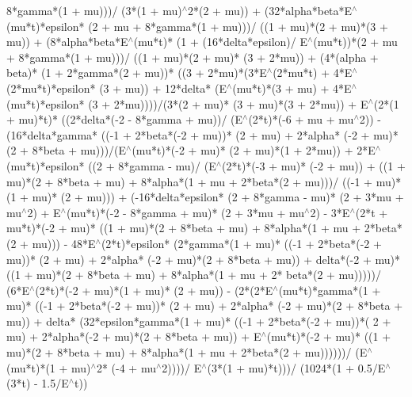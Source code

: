 \documentclass{article}
\begin{document}
\begin{doublespace}
{        8*gamma*(1 + mu)))/
      (3*(1 + mu)${}^{\wedge}$2*(2 + mu)) + 
     (32*alpha*beta*E${}^{\wedge}$(mu*t)*epsilon*
       (2 + mu + 8*gamma*(1 + mu)))/
      ((1 + mu)*(2 + mu)*(3 + mu)) + 
     (8*alpha*beta*E${}^{\wedge}$(mu*t)*
       (1 + (16*delta*epsilon)/
         E${}^{\wedge}$(mu*t))*(2 + mu + 
        8*gamma*(1 + mu)))/
      ((1 + mu)*(2 + mu)*
       (3 + 2*mu)) + 
     (4*(alpha + beta)*
       (1 + 2*gamma*(2 + mu))*
       ((3 + 2*mu)*(3*E${}^{\wedge}$(2*mu*t) + 
          4*E${}^{\wedge}$(2*mu*t)*epsilon*
           (3 + mu)) + 12*delta*
         (E${}^{\wedge}$(mu*t)*(3 + mu) + 
          4*E${}^{\wedge}$(mu*t)*epsilon*
           (3 + 2*mu))))/(3*(2 + mu)*
       (3 + mu)*(3 + 2*mu)) + 
     E${}^{\wedge}$(2*(1 + mu)*t)*
      ((2*delta*(-2 - 8*gamma + mu))/
        (E${}^{\wedge}$(2*t)*(-6 + mu + mu${}^{\wedge}$2)) - 
       (16*delta*gamma*
         ((-1 + 2*beta*(-2 + mu))*
           (2 + mu) + 2*alpha*
           (-2 + mu)*(2 + 8*beta + 
            mu)))/(E${}^{\wedge}$(mu*t)*(-2 + mu)*
         (2 + mu)*(1 + 2*mu)) + 
       2*E${}^{\wedge}$(mu*t)*epsilon*
        ((2 + 8*gamma - mu)/
          (E${}^{\wedge}$(2*t)*(-3 + mu)*
           (-2 + mu)) + 
         ((1 + mu)*(2 + 8*beta + 
            mu) + 8*alpha*(1 + mu + 
            2*beta*(2 + mu)))/
          ((-1 + mu)*(1 + mu)*
           (2 + mu))) + 
       (-16*delta*epsilon*
          (2 + 8*gamma - mu)*
          (2 + 3*mu + mu${}^{\wedge}$2) + 
         E${}^{\wedge}$(mu*t)*(-2 - 8*gamma + mu)*
          (2 + 3*mu + mu${}^{\wedge}$2) - 
         3*E${}^{\wedge}$(2*t + mu*t)*(-2 + mu)*
          ((1 + mu)*(2 + 8*beta + 
            mu) + 8*alpha*(1 + mu + 
            2*beta*(2 + mu))) - 
         48*E${}^{\wedge}$(2*t)*epsilon*
          (2*gamma*(1 + mu)*
            ((-1 + 2*beta*(-2 + mu))*
            (2 + mu) + 2*alpha*
            (-2 + mu)*(2 + 8*beta + 
            mu)) + delta*(-2 + mu)*
            ((1 + mu)*(2 + 8*beta + 
            mu) + 8*alpha*(1 + mu + 2*
            beta*(2 + mu)))))/
        (6*E${}^{\wedge}$(2*t)*(-2 + mu)*(1 + mu)*
         (2 + mu)) - 
       (2*(2*E${}^{\wedge}$(mu*t)*gamma*(1 + mu)*
           ((-1 + 2*beta*(-2 + mu))*
            (2 + mu) + 2*alpha*
            (-2 + mu)*(2 + 8*beta + 
            mu)) + delta*
           (32*epsilon*gamma*(1 + mu)*
            ((-1 + 2*beta*(-2 + mu))*(
            2 + mu) + 2*alpha*(-2 + 
            mu)*(2 + 8*beta + mu)) + 
            E${}^{\wedge}$(mu*t)*(-2 + mu)*
            ((1 + mu)*(2 + 8*beta + 
            mu) + 8*alpha*(1 + mu + 
            2*beta*(2 + mu))))))/
        (E${}^{\wedge}$(mu*t)*(1 + mu)${}^{\wedge}$2*
         (-4 + mu${}^{\wedge}$2))))/
    E${}^{\wedge}$(3*(1 + mu)*t)))/
 (1024*(1 + 0.5/E${}^{\wedge}$(3*t) - 1.5/E${}^{\wedge}$t))}\)
\end{doublespace}
\end{document}
